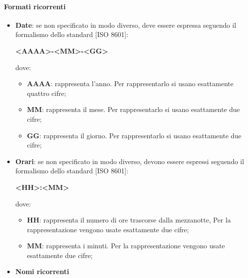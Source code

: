             \paragraph{Formati ricorrenti}
                \begin{itemize}
                    \item\textbf{Date}: se non specificato in modo diverso, deve essere espressa seguendo il formalismo dello standard [ISO 8601]:\\
                        \begin{center}
                            \textbf{<AAAA>-<MM>-<GG>}
                        \end{center}
                        dove:\\
                        \begin{itemize}
                            \item\textbf{AAAA}: rappresenta l’anno. Per rappresentarlo si usano esattamente quattro cifre;
                            \item\textbf{MM}: rappresenta il mese. Per rappresentarlo si usano esattamente due cifre;
                            \item\textbf{GG}: rappresenta il giorno. Per rappresentarlo si usano esattamente due cifre;
                        \end{itemize}
                    \item\textbf{Orari}:  se non specificato in modo diverso, devono essere espressi seguendo il formalismo dello standard [ISO 8601]:\\
                        \begin{center}
                            \textbf{<HH>:<MM>}
                        \end{center}
                        dove:\\
                        \begin{itemize}
                            \item\textbf{HH}: rappresenta il numero di ore trascorse dalla mezzanotte, Per la rappresentazione vengono usate esattamente due cifre;
                            \item\textbf{MM}: rappresenta i minuti. Per la rappresentazione vengono usate esattamente due cifre;
                        \end{itemize}
                    \item\textbf{Nomi ricorrenti}\\
                        \begin{itemize}

\end{itemize}
\end{itemize}
